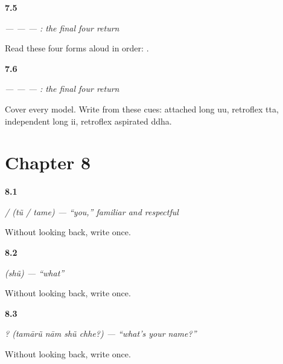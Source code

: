 \noindent\begin{minipage}[t]{\linewidth}
\raggedright
\hypertarget{review-GU-R07-second-four-r1-reading}{\textbf{7.5}} \emph{ —  —  — : the final four return}\par
\small Read these four forms aloud in order:    .
\end{minipage}\par\medskip

\noindent\begin{minipage}[t]{\linewidth}
\raggedright
\hypertarget{review-GU-R07-second-four-r1-dictation}{\textbf{7.6}} \emph{ —  —  — : the final four return}\par
\small Cover every model. Write from these cues: attached long uu, retroflex tta, independent long ii, retroflex aspirated ddha.
\end{minipage}\par\medskip

\section*{Chapter 8}

\noindent\begin{minipage}[t]{\linewidth}
\raggedright
\hypertarget{review-GU-C02-tu-tame-ra-retrieval}{\textbf{8.1}} \emph{ /  (tũ / tame) — \textquotedblleft{}you,\textquotedblright{} familiar and respectful}\par
\small Without looking back, write  once.
\end{minipage}\par\medskip

\noindent\begin{minipage}[t]{\linewidth}
\raggedright
\hypertarget{review-GU-C02-shun-da-retrieval}{\textbf{8.2}} \emph{ (shũ) — \textquotedblleft{}what\textquotedblright{}}\par
\small Without looking back, write  once.
\end{minipage}\par\medskip

\noindent\begin{minipage}[t]{\linewidth}
\raggedright
\hypertarget{review-GU-C02-tamarun-naam-shun-chhe-va-retrieval}{\textbf{8.3}} \emph{   ? (tamārũ nām shũ chhe?) — \textquotedblleft{}what's your name?\textquotedblright{}}\par
\small Without looking back, write  once.
\end{minipage}\par\medskip

